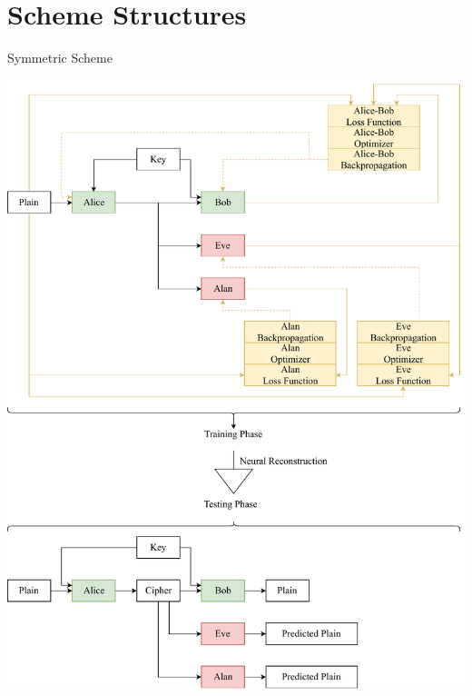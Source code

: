 \documentclass{beamer}
\begin{document}
		\section{Scheme Structures}
		\begin{frame}{Symmetric Scheme}
			\begin{center}
				\includegraphics[height=0.9\textheight]{symmetricScheme}
			\end{center}
		\end{frame}
\end{document}
